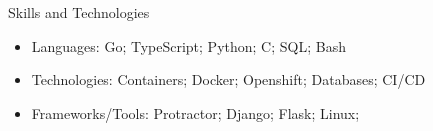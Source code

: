 \documentclass[]{mcdowellcv}
\begin{document}
	\begin{cvsection}{Skills and Technologies}
		\begin{cvsubsection}{}{}{}	
			\begin{itemize}
				\item Languages: Go; TypeScript; Python; C; SQL; Bash
				\item Technologies: Containers; Docker; Openshift; Databases; CI/CD
				\item Frameworks/Tools: Protractor; Django; Flask; Linux;
			\end{itemize}
		\end{cvsubsection}
	\end{cvsection}
	
\end{document}
